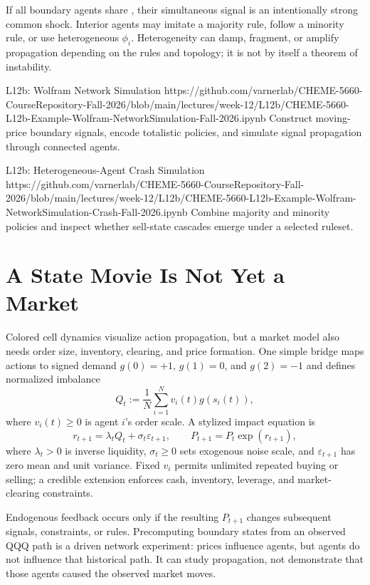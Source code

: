 \documentclass[11pt]{article}
\begin{document}
If all boundary agents share , their simultaneous signal is an intentionally strong common shock. Interior agents may imitate a majority rule, follow a minority rule, or use heterogeneous $\phi_i$. Heterogeneity can damp, fragment, or amplify propagation depending on the rules and topology; it is not by itself a theorem of instability.

\notebooklink
  {L12b: Wolfram Network Simulation}
  {https://github.com/varnerlab/CHEME-5660-CourseRepository-Fall-2026/blob/main/lectures/week-12/L12b/CHEME-5660-L12b-Example-Wolfram-NetworkSimulation-Fall-2026.ipynb}
  {Construct moving-price boundary signals, encode totalistic policies, and simulate signal propagation through connected agents.}

\notebooklink
  {L12b: Heterogeneous-Agent Crash Simulation}
  {https://github.com/varnerlab/CHEME-5660-CourseRepository-Fall-2026/blob/main/lectures/week-12/L12b/CHEME-5660-L12b-Example-Wolfram-NetworkSimulation-Crash-Fall-2026.ipynb}
  {Combine majority and minority policies and inspect whether sell-state cascades emerge under a selected ruleset.}

\section{A State Movie Is Not Yet a Market}

Colored cell dynamics visualize action propagation, but a market model also needs order size, inventory, clearing, and price formation. One simple bridge maps actions to signed demand $g(0)=+1$, $g(1)=0$, and $g(2)=-1$ and defines normalized imbalance
\begin{equation}
  \label{eq:imbalance}
  Q_t:=\frac{1}{N}\sum_{i=1}^{N}v_i(t)g(s_i(t)),
\end{equation}
where $v_i(t)\geq0$ is agent $i$'s order scale. A stylized impact equation is
\begin{equation}
  \label{eq:price-impact}
  r_{t+1}=\lambda_t Q_t+\sigma_t\varepsilon_{t+1},
  \qquad
  P_{t+1}=P_t\exp(r_{t+1}),
\end{equation}
where $\lambda_t>0$ is inverse liquidity, $\sigma_t\geq0$ sets exogenous noise scale, and $\varepsilon_{t+1}$ has zero mean and unit variance. Fixed $v_i$ permits unlimited repeated buying or selling; a credible extension enforces cash, inventory, leverage, and market-clearing constraints.

Endogenous feedback occurs only if the resulting $P_{t+1}$ changes subsequent signals, constraints, or rules. Precomputing boundary states from an observed QQQ path is a driven network experiment: prices influence agents, but agents do not influence that historical path. It can study propagation, not demonstrate that those agents caused the observed market moves.
\end{document}
